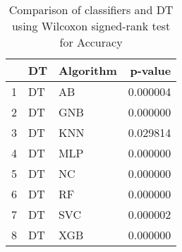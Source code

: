 \begin{table}
\footnotesize
\caption{Comparison of classifiers and DT using Wilcoxon signed-rank test for Accuracy}
\label{tab:DT wilcoxon Accuracy comparison}
\begin{tabular}{lllr}
\hline
 & DT & Algorithm & p-value \\
\hline
1 & DT & AB & 0.000004 \\
2 & DT & GNB & 0.000000 \\
3 & DT & KNN & 0.029814 \\
4 & DT & MLP & 0.000000 \\
5 & DT & NC & 0.000000 \\
6 & DT & RF & 0.000000 \\
7 & DT & SVC & 0.000002 \\
8 & DT & XGB & 0.000000 \\
\hline
\end{tabular}
\end{table}
